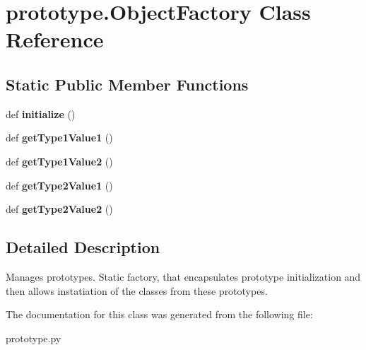 \hypertarget{classprototype_1_1_object_factory}{}\section{prototype.\+Object\+Factory Class Reference}
\label{classprototype_1_1_object_factory}
\subsection*{Static Public Member Functions}
\begin{DoxyCompactItemize}
\item 
\mbox{\label{classprototype_1_1_object_factory_ab9e8031330594af772d0e464a97f639f}} 
def {\bfseries initialize} ()
\item 
\mbox{\label{classprototype_1_1_object_factory_a7d9693c4c85b69eb1cbd3e837160eefb}} 
def {\bfseries get\+Type1\+Value1} ()
\item 
\mbox{\label{classprototype_1_1_object_factory_a714d45fccd5421d4302c2941f409e534}} 
def {\bfseries get\+Type1\+Value2} ()
\item 
\mbox{\label{classprototype_1_1_object_factory_a7d3f3ef590862a071009ba0cca5c844c}} 
def {\bfseries get\+Type2\+Value1} ()
\item 
\mbox{\label{classprototype_1_1_object_factory_a044abe63bccc47babe3aaa9cee223e3d}} 
def {\bfseries get\+Type2\+Value2} ()
\end{DoxyCompactItemize}


\subsection{Detailed Description}
\begin{DoxyVerb}Manages prototypes.
Static factory, that encapsulates prototype
initialization and then allows instatiation
of the classes from these prototypes.
\end{DoxyVerb}
 

The documentation for this class was generated from the following file\+:\begin{DoxyCompactItemize}
\item 
prototype.\+py\end{DoxyCompactItemize}
